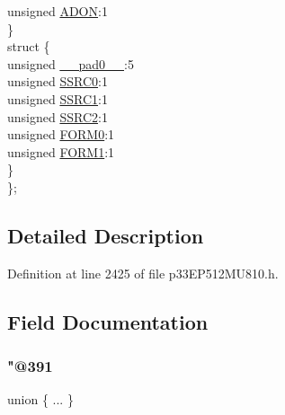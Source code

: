 \begin{DoxyCompactItemize}
\begin{tabbing}
\>\>unsigned \hyperlink{structtag_a_d1_c_o_n1_b_i_t_s_aa35d5855858b9350b403822a0ebe771f}{ADON}:1\\
\>\} \\
\>struct \{\\
\>\>unsigned \hyperlink{structtag_a_d1_c_o_n1_b_i_t_s_adf71f3d8410c1f1dbbc96680a92c49af}{\_\_pad0\_\_}:5\\
\>\>unsigned \hyperlink{structtag_a_d1_c_o_n1_b_i_t_s_acd7795c57edda66fa10332aa8b6b162e}{SSRC0}:1\\
\>\>unsigned \hyperlink{structtag_a_d1_c_o_n1_b_i_t_s_aefc0488a9751bcca8f6363a20530a1cf}{SSRC1}:1\\
\>\>unsigned \hyperlink{structtag_a_d1_c_o_n1_b_i_t_s_a95ec48e12cb5dc231b4951f71d394eac}{SSRC2}:1\\
\>\>unsigned \hyperlink{structtag_a_d1_c_o_n1_b_i_t_s_aed90db8350c817f0054f588f1cdfe042}{FORM0}:1\\
\>\>unsigned \hyperlink{structtag_a_d1_c_o_n1_b_i_t_s_ae89d5eddf961b33b93d2c9d49b8e7d1a}{FORM1}:1\\
\>\} \\
\}; \\

\end{tabbing}\end{DoxyCompactItemize}


\subsection{Detailed Description}


Definition at line 2425 of file p33\+E\+P512\+M\+U810.\+h.



\subsection{Field Documentation}
\mbox{\label{structtag_a_d1_c_o_n1_b_i_t_s_a65162df1159f2c773c9edce0f1457731}} 
\subsubsection{\texorpdfstring{"@391}{@391}}
{\footnotesize\ttfamily union \{ ... \} }

\mbox{\label{structtag_a_d1_c_o_n1_b_i_t_s_adf71f3d8410c1f1dbbc96680a92c49af}} 
